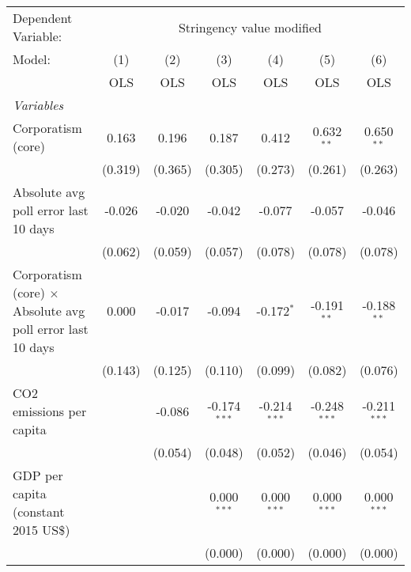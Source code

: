 
\begingroup
\centering
\begin{tabular}{lcccccc}
   \toprule
   Dependent Variable: & \multicolumn{6}{c}{Stringency value modified}\\
   Model:                                                            & (1)     & (2)     & (3)            & (4)            & (5)            & (6)\\  
                                                                     &  OLS    & OLS     & OLS            & OLS            & OLS            & OLS\\  
   \midrule
   \emph{Variables}\\
   Corporatism (core)                                                & 0.163   & 0.196   & 0.187          & 0.412          & 0.632$^{**}$   & 0.650$^{**}$\\   
                                                                     & (0.319) & (0.365) & (0.305)        & (0.273)        & (0.261)        & (0.263)\\   
   Absolute avg poll error last 10 days                              & -0.026  & -0.020  & -0.042         & -0.077         & -0.057         & -0.046\\   
                                                                     & (0.062) & (0.059) & (0.057)        & (0.078)        & (0.078)        & (0.078)\\   
   Corporatism (core) $\times$ Absolute avg poll error last 10 days  & 0.000   & -0.017  & -0.094         & -0.172$^{*}$   & -0.191$^{**}$  & -0.188$^{**}$\\   
                                                                     & (0.143) & (0.125) & (0.110)        & (0.099)        & (0.082)        & (0.076)\\   
   CO2 emissions per capita                                          &         & -0.086  & -0.174$^{***}$ & -0.214$^{***}$ & -0.248$^{***}$ & -0.211$^{***}$\\   
                                                                     &         & (0.054) & (0.048)        & (0.052)        & (0.046)        & (0.054)\\   
   GDP per capita (constant 2015 US\$)                               &         &         & 0.000$^{***}$  & 0.000$^{***}$  & 0.000$^{***}$  & 0.000$^{***}$\\   
                                                                     &         &         & (0.000)        & (0.000)        & (0.000)        & (0.000)\\   

\end{tabular}
